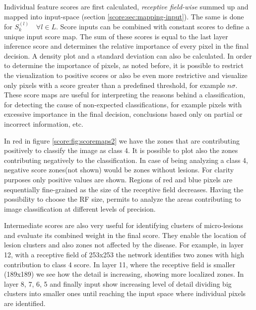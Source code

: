 Individual feature scores are first calculated, \emph{receptive field-wise} summed up and mapped into input-space (section \ref{score:sec:mapping-input}). The same is done for $S_k^{(l)} \quad \forall l \in L$. Score inputs can be combined with constant scores to define a unique input score map. The sum of these scores is equal to the last layer inference score and determines the relative importance of every pixel in the final decision. A density plot and a standard deviation can also be calculated. In order to determine the importance of pixels, as noted before, it is possible to restrict the visualization to positive scores or also be even more restrictive and visualize only pixels with a score greater than a predefined threshold, for example $n \sigma$. These score maps are useful for interpreting the reasons behind a classification, for detecting the cause of non-expected classifications, for example pixels with excessive importance in the final decision, conclusions based only on partial or incorrect information, etc. 

In red in figure \ref{score:fig:scoremaps2} we have the zones that are contributing positively to classify the image as class 4. It is possible to plot also the zones contributing negatively to the classification. In case of being analyzing a class 4, negative score zones(not shown) would be zones without lesions. For clarity purposes only positive values are shown. Regions of red and blue pixels are sequentially fine-grained as the size of the receptive field decreases. Having the possibility to choose the RF size, permits to analyze the areas contributing to image classification at different levels of precision.

Intermediate scores are also very useful for identifying clusters of micro-lesions and evaluate its combined weight in the final score. They enable the location of lesion clusters and also zones not affected by the disease. For example, in layer 12, with a receptive field of 253x253 the network identifies two zones with high contribution to class 4 score. In layer 11, where the receptive field is smaller (189x189) we see how the detail is increasing, showing more localized zones. In layer 8, 7, 6, 5 and finally input show increasing level of detail dividing big clusters into smaller ones until reaching the input space where individual pixels are identified.

